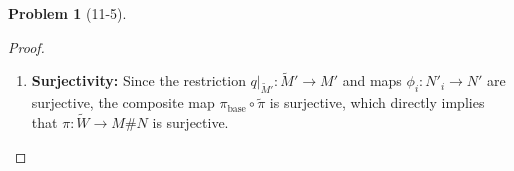 \documentclass[11pt, a4paper]{article}
\theoremstyle{definition}
\newtheorem{prob}{Problem}
\newenvironment{problem}[1][]{\begin{prob}[#1]\normalfont}{\end{prob}\vspace{1.5em}}
\begin{document}
\begin{problem}[11-5]
\begin{proof}
\begin{enumerate}
        Then we have commutative diagram: 
        $$\begin{array}{ccc} \widetilde{M}' \sqcup N'_1 \sqcup \dots \sqcup N'_k & \xrightarrow{\quad \pi_{\text{base}} \circ \widetilde{\pi} \quad} & M \# N \\ \Big\downarrow {\scriptstyle q_{cov}} & \nearrow_{\pi} & \\ \widetilde{W} = (\widetilde{M}' \sqcup N'_1 \sqcup \dots \sqcup N'_k) / \sim_g & & \end{array}$$
        By the characteristic property of the quotient topology(Thm.3.70), $\pi_{\text{base}} \circ \widetilde{\pi}$ induces 
        a well-defined and continuous map $\pi : \widetilde{W} \to M \# N$.
        
        \item \textbf{Surjectivity:} Since the restriction $q|_{\widetilde{M}'} : \widetilde{M}' \to M'$ and maps 
        $\phi_i : N'_i \to N'$ are surjective, the composite map $\pi_{\text{base}} \circ \widetilde{\pi}$ is surjective, 
        which directly implies that $\pi : \widetilde{W} \to M \# N$ is surjective.


\end{enumerate}
\end{proof}
\end{problem}
\end{document}
